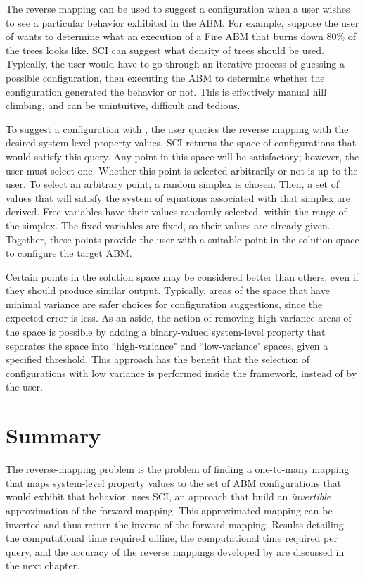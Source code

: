 The reverse mapping can be used to suggest a configuration when a user wishes to see a particular behavior exhibited in the ABM.
For example, suppose the user of \fw wants to determine what an execution of a Fire ABM that burns down 80\% of the trees looks like.
SCI can suggest what density of trees should be used.
Typically, the user would have to go through an iterative process of guessing a possible configuration, then executing the ABM to determine whether the configuration generated the behavior or not.
This is effectively manual hill climbing, and can be unintuitive, difficult and tedious.

To suggest a configuration with \fw, the user queries the reverse mapping with the desired system-level property values.
SCI returns the space of configurations that would satisfy this query.
Any point in this space will be satisfactory; however, the user must select one.
Whether this point is selected arbitrarily or not is up to the user.
To select an arbitrary point, a random simplex is chosen.
Then, a set of values that will satisfy the system of equations associated with that simplex are derived.
Free variables have their values randomly selected, within the range of the simplex.
The fixed variables are fixed, so their values are already given.
Together, these points provide the user with a suitable point in the solution space to configure the target ABM.

Certain points in the solution space may be considered better than others, even if they should produce similar output.
Typically, areas of the space that have minimal variance are safer choices for configuration suggestions, since the expected error is less.
As an aside, the action of removing high-variance areas of the space is possible by adding a binary-valued system-level property that separates the space into ``high-variance" and ``low-variance" spaces, given a specified threshold.
This approach has the benefit that the selection of configurations with low variance is performed inside the framework, instead of by the user.




\section{Summary}
The reverse-mapping problem is the problem of finding a one-to-many mapping that maps system-level property values to the set of ABM configurations that would exhibit that behavior.
\fw uses SCI, an approach that build an \textit{invertible} approximation of the forward mapping.
This approximated mapping can be inverted and thus return the inverse of the forward mapping.
Results detailing the computational time required offline, the computational time required per query, and the accuracy of the reverse mappings developed by \fw are discussed in the next chapter.
